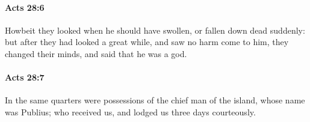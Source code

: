 		\paragraph{Acts 28:6} %
			\label{ACTS-28-6}

			Howbeit they looked when he should have swollen, or fallen down dead suddenly: but after they had looked a great while, and saw no harm come to him, they changed their minds, and said that he was a god.

			\begin{framed}
			\scriptsize
				\begin{compactdesc}
					\item[SBLG] 
				\end{compactdesc}
			\end{framed}

		\paragraph{Acts 28:7} %
			\label{ACTS-28-7}

			In the same quarters were possessions of the chief man of the island, whose name was Publius; who received us, and lodged us three days courteously.

